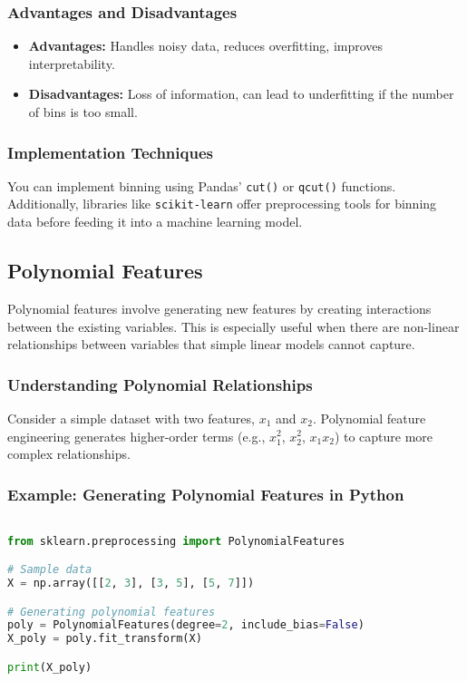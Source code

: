 \documentclass{article}
\begin{document}
\subsubsection{Advantages and Disadvantages}
\begin{itemize}
    \item \textbf{Advantages:} Handles noisy data, reduces overfitting, improves interpretability.
    \item \textbf{Disadvantages:} Loss of information, can lead to underfitting if the number of bins is too small.
\end{itemize}

\subsubsection{Implementation Techniques}
You can implement binning using Pandas' \texttt{cut()} or \texttt{qcut()} functions. Additionally, libraries like \texttt{scikit-learn} offer preprocessing tools for binning data before feeding it into a machine learning model.

\subsection{Polynomial Features}
Polynomial features involve generating new features by creating interactions between the existing variables. This is especially useful when there are non-linear relationships between variables that simple linear models cannot capture.

\subsubsection{Understanding Polynomial Relationships}
Consider a simple dataset with two features, $x_1$ and $x_2$. Polynomial feature engineering generates higher-order terms (e.g., $x_1^2$, $x_2^2$, $x_1x_2$) to capture more complex relationships.

\subsubsection{Example: Generating Polynomial Features in Python}

\begin{lstlisting}[language=Python]

from sklearn.preprocessing import PolynomialFeatures

# Sample data
X = np.array([[2, 3], [3, 5], [5, 7]])

# Generating polynomial features
poly = PolynomialFeatures(degree=2, include_bias=False)
X_poly = poly.fit_transform(X)

print(X_poly)
\end{lstlisting}
\end{document}
